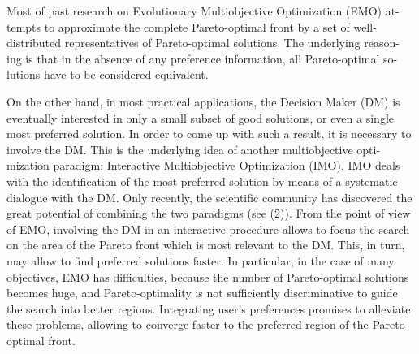 Most of past research on Evolutionary Multiobjective Optimization (EMO) at-
tempts to approximate the complete Pareto-optimal front by a set of well-
distributed representatives of Pareto-optimal solutions. The underlying reason-
ing is that in the absence of any preference information, all Pareto-optimal so-
lutions have to be considered equivalent.


    On the other hand, in most practical applications, the Decision Maker (DM)
is eventually interested in only a small subset of good solutions, or even a single
most preferred solution. In order to come up with such a result, it is necessary
to involve the DM. This is the underlying idea of another multiobjective opti-
mization paradigm: Interactive Multiobjective Optimization (IMO). IMO deals
with the identification of the most preferred solution by means of a systematic
dialogue with the DM. Only recently, the scientific community has discovered
the great potential of combining the two paradigms (see (2)). From the point of
view of EMO, involving the DM in an interactive procedure allows to focus the
search on the area of the Pareto front which is most relevant to the DM. This,
in turn, may allow to find preferred solutions faster. In particular, in the case
of many objectives, EMO has difficulties, because the number of Pareto-optimal
solutions becomes huge, and Pareto-optimality is not sufficiently discriminative
to guide the search into better regions. Integrating user’s preferences promises
to alleviate these problems, allowing to converge faster to the preferred region
of the Pareto-optimal front.
